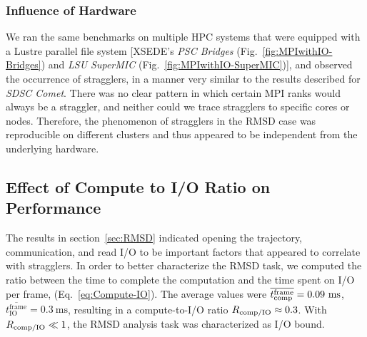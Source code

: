 \subsubsection*{Influence of Hardware}
We ran the same benchmarks on multiple HPC systems that were equipped with a Lustre parallel file system [XSEDE's \emph{PSC Bridges} (Fig.~\ref{fig:MPIwithIO-Bridges}) and \emph{LSU SuperMIC} (Fig.~\ref{fig:MPIwithIO-SuperMIC})], and observed the occurrence of stragglers, in a manner very similar to the results described for \emph{SDSC Comet}.
There was no clear pattern in which certain MPI ranks would always be a straggler, and neither could we trace stragglers to specific cores or nodes.
Therefore, the phenomenon of stragglers in the RMSD case was reproducible on different clusters and thus appeared to be independent from the underlying hardware.

\subsection{Effect of Compute to I/O Ratio on Performance}
\label{sec:bound}

The results in section~\ref{sec:RMSD} indicated opening the trajectory, communication, and read I/O to be important factors that appeared to correlate with stragglers. 
In order to better characterize the RMSD task, we computed the ratio between the time to complete the computation and the time spent on I/O per frame, \RcompIO (Eq.~\ref{eq:Compute-IO}).
The average values were $\overline{\tcomp^{\text{frame}}} = 0.09\ \text{ms}$, $\overline{t_{\text{IO}}^{\text{frame}}} = 0.3\ \text{ms}$, resulting in a compute-to-I/O ratio $R_{\text{comp/IO}} \approx 0.3$.
With $R_{\text{comp/IO}} \ll 1$, the RMSD analysis task was characterized as I/O bound.

